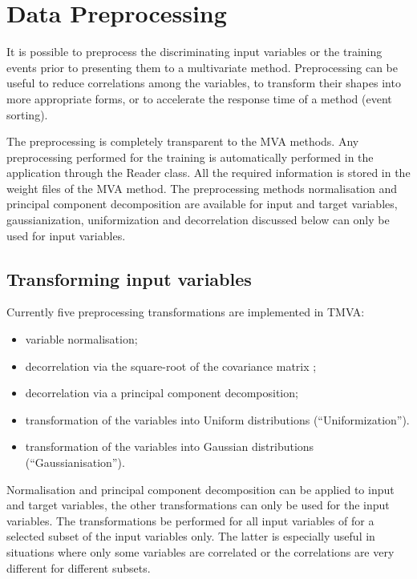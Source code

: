 \section{Data Preprocessing}
\label{sec:dataPreprocessing}

It is possible to preprocess the discriminating input variables or the training events prior 
to presenting them to a multivariate method. Preprocessing can be useful to reduce correlations 
among the variables, to transform their shapes into more appropriate forms, or to accelerate 
the response time of a method (event sorting). 

The preprocessing is completely transparent to 
the MVA methods. Any preprocessing performed for the training is automatically performed in 
the application through the Reader class. All the required information is stored in the 
weight files of the MVA method. The preprocessing methods normalisation and principal component 
decomposition are available for input and target variables, gaussianization, uniformization and decorrelation 
discussed below can only be used for input variables. 

\subsection{Transforming input variables}
\label{sec:variableTransform}

Currently five preprocessing  
transformations
are implemented in TMVA:
\begin{itemize}
\item variable normalisation;
\item decorrelation via the square-root of the covariance matrix ;
\item decorrelation via a principal component decomposition;
\item transformation of the variables into Uniform distributions (``Uniformization'').
\item transformation of the variables into Gaussian distributions (``Gaussianisation'').
\end{itemize}
Normalisation and principal component decomposition can be applied to input and target variables, 
the other transformations can only be used for the input variables.  The transformations be performed for all input variables of for a selected subset of the input variables only. The latter is especially useful in situations where only some variables are correlated or the correlations are very different for different subsets.

